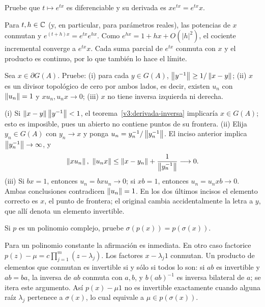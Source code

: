 \begin{ejercicio}\label{ej:v3-l21-4}
Pruebe que $t\mapsto e^{tx}$ es diferenciable y su derivada es $xe^{tx}=e^{tx}x$.
\end{ejercicio}
\begin{solucion}
Para $t,h\in\mathbb C$ (y, en particular, para parámetros reales), las potencias de $x$ conmutan y $e^{(t+h)x}=e^{tx}e^{hx}$. Como $e^{hx}=1+hx+O(|h|^2)$, el cociente incremental converge a $e^{tx}x$. Cada suma parcial de $e^{tx}$ conmuta con $x$ y el producto es continuo, por lo que también lo hace el límite.
\end{solucion}

\begin{ejercicio}\label{ej:v3-l21-5}
Sea $x\in\partial G(A)$. Pruebe: (i) para cada $y\in G(A)$,
$\left\lVert y^{-1}\right\rVert\ge1/\left\lVert x-y\right\rVert$; (ii) $x$ es un divisor topológico de cero por ambos lados, es decir, existen $u_n$ con $\left\lVert u_n\right\rVert=1$ y $xu_n,u_nx\to0$; (iii) $x$ no tiene inversa izquierda ni derecha.
\end{ejercicio}
\begin{solucion}
(i) Si $\left\lVert x-y\right\rVert\left\lVert y^{-1}\right\rVert<1$, el teorema~\ref{v3:derivada-inversa} implicaría $x\in G(A)$; esto es imposible, pues un abierto no contiene puntos de su frontera. (ii) Elija $y_n\in G(A)$ con $y_n\to x$ y ponga $u_n=y_n^{-1}/\left\lVert y_n^{-1}\right\rVert$. El inciso anterior implica $\left\lVert y_n^{-1}\right\rVert\to\infty$, y
\[
 \norm{xu_n},\ \norm{u_nx}\le\norm{x-y_n}+\frac1{\norm{y_n^{-1}}}\longrightarrow0.
\]
(iii) Si $bx=1$, entonces $u_n=bxu_n\to0$; si $xb=1$, entonces $u_n=u_nxb\to0$. Ambas conclusiones contradicen $\left\lVert u_n\right\rVert=1$. En los dos últimos incisos el elemento correcto es $x$, el punto de frontera; el original cambia accidentalmente la letra a $y$, que allí denota un elemento invertible.
\end{solucion}

\begin{ejercicio}\label{ej:v3-l22-1}
Si $p$ es un polinomio complejo, pruebe $\sigma(p(x))=p(\sigma(x))$.
\end{ejercicio}
\begin{solucion}
Para un polinomio constante la afirmación es inmediata. En otro caso factorice $p(z)-\mu=c\prod_{j=1}^m(z-\lambda_j)$. Los factores $x-\lambda_j1$ conmutan. Un producto de elementos que conmutan es invertible si y sólo si todos lo son: si $ab$ es invertible y $ab=ba$, la inversa de $ab$ conmuta con $a,b$, y $b(ab)^{-1}$ es inversa bilateral de $a$; se itera este argumento. Así $p(x)-\mu1$ no es invertible exactamente cuando alguna raíz $\lambda_j$ pertenece a $\sigma(x)$, lo cual equivale a $\mu\in p(\sigma(x))$.
\end{solucion}

